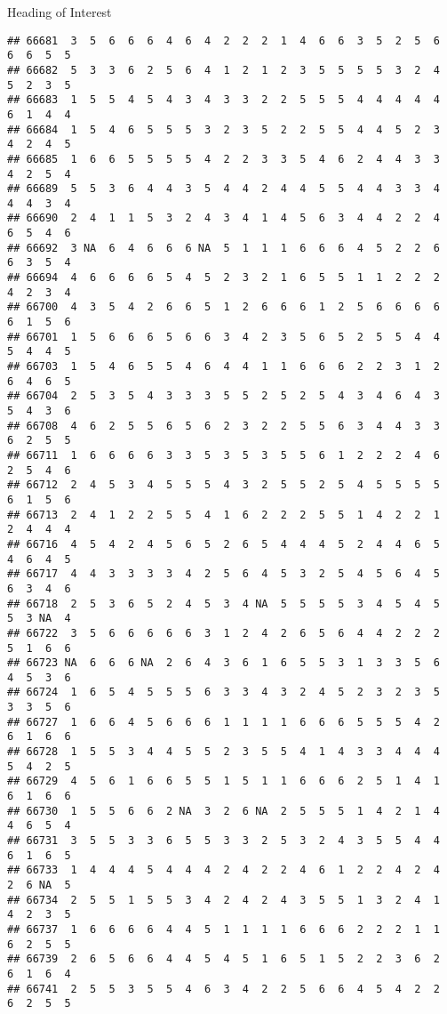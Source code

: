 \documentclass[
  ignorenonframetext,
]{beamer}
\begin{document}
\begin{frame}[fragile]{Heading of Interest}
\begin{verbatim}
## 66681  3  5  6  6  6  4  6  4  2  2  2  1  4  6  6  3  5  2  5  6  6  6  5  5
## 66682  5  3  3  6  2  5  6  4  1  2  1  2  3  5  5  5  5  3  2  4  5  2  3  5
## 66683  1  5  5  4  5  4  3  4  3  3  2  2  5  5  5  4  4  4  4  4  6  1  4  4
## 66684  1  5  4  6  5  5  5  3  2  3  5  2  2  5  5  4  4  5  2  3  4  2  4  5
## 66685  1  6  6  5  5  5  5  4  2  2  3  3  5  4  6  2  4  4  3  3  4  2  5  4
## 66689  5  5  3  6  4  4  3  5  4  4  2  4  4  5  5  4  4  3  3  4  4  4  3  4
## 66690  2  4  1  1  5  3  2  4  3  4  1  4  5  6  3  4  4  2  2  4  6  5  4  6
## 66692  3 NA  6  4  6  6  6 NA  5  1  1  1  6  6  6  4  5  2  2  6  6  3  5  4
## 66694  4  6  6  6  6  5  4  5  2  3  2  1  6  5  5  1  1  2  2  2  4  2  3  4
## 66700  4  3  5  4  2  6  6  5  1  2  6  6  6  1  2  5  6  6  6  6  6  1  5  6
## 66701  1  5  6  6  6  5  6  6  3  4  2  3  5  6  5  2  5  5  4  4  5  4  4  5
## 66703  1  5  4  6  5  5  4  6  4  4  1  1  6  6  6  2  2  3  1  2  6  4  6  5
## 66704  2  5  3  5  4  3  3  3  5  5  2  5  2  5  4  3  4  6  4  3  5  4  3  6
## 66708  4  6  2  5  5  6  5  6  2  3  2  2  5  5  6  3  4  4  3  3  6  2  5  5
## 66711  1  6  6  6  6  3  3  5  3  5  3  5  5  6  1  2  2  2  4  6  2  5  4  6
## 66712  2  4  5  3  4  5  5  5  4  3  2  5  5  2  5  4  5  5  5  5  6  1  5  6
## 66713  2  4  1  2  2  5  5  4  1  6  2  2  2  5  5  1  4  2  2  1  2  4  4  4
## 66716  4  5  4  2  4  5  6  5  2  6  5  4  4  4  5  2  4  4  6  5  4  6  4  5
## 66717  4  4  3  3  3  3  4  2  5  6  4  5  3  2  5  4  5  6  4  5  6  3  4  6
## 66718  2  5  3  6  5  2  4  5  3  4 NA  5  5  5  5  3  4  5  4  5  5  3 NA  4
## 66722  3  5  6  6  6  6  6  3  1  2  4  2  6  5  6  4  4  2  2  2  5  1  6  6
## 66723 NA  6  6  6 NA  2  6  4  3  6  1  6  5  5  3  1  3  3  5  6  4  5  3  6
## 66724  1  6  5  4  5  5  5  6  3  3  4  3  2  4  5  2  3  2  3  5  3  3  5  6
## 66727  1  6  6  4  5  6  6  6  1  1  1  1  6  6  6  5  5  5  4  2  6  1  6  6
## 66728  1  5  5  3  4  4  5  5  2  3  5  5  4  1  4  3  3  4  4  4  5  4  2  5
## 66729  4  5  6  1  6  6  5  5  1  5  1  1  6  6  6  2  5  1  4  1  6  1  6  6
## 66730  1  5  5  6  6  2 NA  3  2  6 NA  2  5  5  5  1  4  2  1  4  4  6  5  4
## 66731  3  5  5  3  3  6  5  5  3  3  2  5  3  2  4  3  5  5  4  4  6  1  6  5
## 66733  1  4  4  4  5  4  4  4  2  4  2  2  4  6  1  2  2  4  2  4  2  6 NA  5
## 66734  2  5  5  1  5  5  3  4  2  4  2  4  3  5  5  1  3  2  4  1  4  2  3  5
## 66737  1  6  6  6  6  4  4  5  1  1  1  1  6  6  6  2  2  2  1  1  6  2  5  5
## 66739  2  6  5  6  6  4  4  5  4  5  1  6  5  1  5  2  2  3  6  2  6  1  6  4
## 66741  2  5  5  3  5  5  4  6  3  4  2  2  5  6  6  4  5  4  2  2  6  2  5  5

\end{verbatim}
\end{frame}
\end{document}
